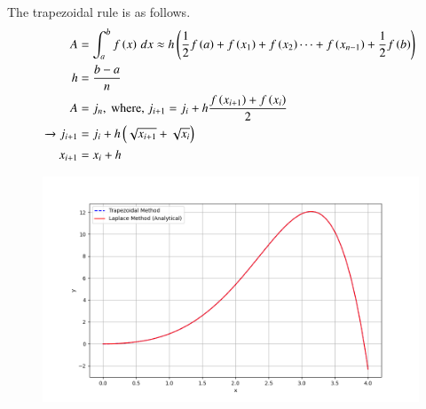 \documentclass[journal]{IEEEtran}
\numberwithin{equation}{enumi}
\numberwithin{figure}{enumi}
\begin{document}
\begin{enumerate}
The trapezoidal rule is as follows.
\begin{align}
    A &= \int_a^b f\left(x\right)\, dx \approx h\left(\frac{1}{2}f\left(a\right) + f\left(x_1\right) + f\left(x_2\right) \cdots + f\left(x_{n-1}\right) + \frac{1}{2}f\left(b\right)\right)\\
    h &= \frac{b-a}{n}\\
    A &= j_n, \text{ where, } j_{i + 1} = j_i + h\frac{f\left(x_{i+1}\right) + f\left(x_i\right)}{2}\\ 
        \xrightarrow{} j_{i + 1} &= j_i + h\left(\sqrt{x_{i+1}}+\sqrt{x_{i}}\right)\\
    x_{i+1} &= x_i + h\\
\end{align}
\begin{figure}[h!]
   \centering
   \includegraphics[width=0.7\linewidth]{figs/Figure_1.png}
\end{figure}   
 

\end{enumerate}
\end{document}
